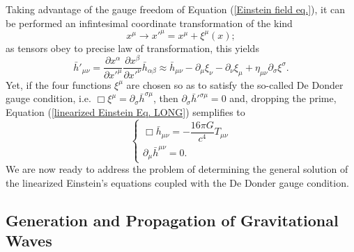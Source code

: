 \documentclass[12pt,twoside,openany]{book}
\begin{document}
Taking advantage of the gauge freedom of Equation (\ref{Einstein field eq.}), it can be performed an infintesimal coordinate transformation of the kind
\begin{equation}
    x^\mu \rightarrow{}x'^\mu=x^\mu+\xi^\mu(x);
\end{equation}
as tensors obey to precise law of transformation, this yields
\begin{equation}
    \bar{h}'_{\mu\nu}=\frac{\partial x^\alpha}{\partial x'^\mu}\frac{\partial x^\beta}{\partial x'^\nu}\bar{h}_{\alpha\beta}\approx \bar{h}_{\mu\nu}-\partial _\mu \xi_\nu -\partial_\nu \xi_\mu+\eta_{\mu\nu}\partial_\sigma\xi^\sigma.
\end{equation}
Yet, if the four functions $\xi^\mu$ are chosen so as to satisfy the so-called De Donder gauge condition, i.e. $\Box\xi^\mu=\partial_\sigma\bar{h}^{\sigma\mu}$, then $\partial_\sigma\bar{h}'^{\sigma\mu}=0$ and, dropping the prime, Equation (\ref{linearized Einstein Eq. LONG}) semplifies to
\begin{equation}\label{linearized Einstein eq + gauge condition}
\begin{cases}
\Box \bar{h}_{\mu\nu} = -\dfrac{16\pi G}{c^4} T_{\mu\nu} \\
\partial_\mu\bar{h}^{\mu\nu}=0.
\end{cases}
\end{equation}
We are now ready to address the problem of determining  the general solution of the linearized Einstein's equations coupled with the De Donder gauge condition. 


\subsection{Generation and Propagation of Gravitational Waves}
\end{document}
